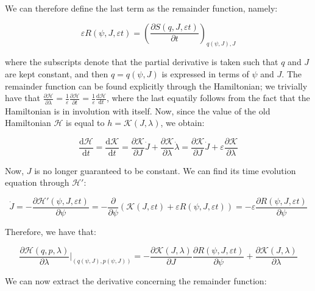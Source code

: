 We can therefore define the last term as the remainder function, namely:

\begin{equation}
    \varepsilon R(\psi, J, \varepsilon t)=\left(\frac{\partial S(q,J,\varepsilon t)}{\partial t}\right)_{q(\psi,J),J}
\end{equation}

where the subscripts denote that the partial derivative is taken such that $q$ and $J$ are kept constant, and then $q=q(\psi, J)$ is expressed in terms of $\psi$ and $J$. The remainder function can be found explicitly through the Hamiltonian; we trivially have that $\frac{\partial \mathcal{H}}{\partial \lambda}=\frac{1}{\varepsilon}\frac{\partial \mathcal{H}}{\partial t}=\frac{1}{\varepsilon}\frac{\mathrm{d}\mathcal{H}}{\mathrm{d}t}$, where the last equatily follows from the fact that the Hamiltonian is in involution with itself. Now, since the value of the old Hamiltonian $\mathcal{H}$ is equal to $h=\mathcal{K}(J,\lambda)$, we obtain:

\begin{equation*}
    \frac{\mathrm{d}\mathcal{H}}{\mathrm{d}t}=\frac{\mathrm{d}\mathcal{K}}{\mathrm{d}t}=\frac{\partial \mathcal{K}}{\partial J}\dot{J}+\frac{\partial\mathcal{K}}{\partial \lambda}\dot{\lambda}=\frac{\partial \mathcal{K}}{\partial J}\dot{J}+\varepsilon \frac{\partial \mathcal{K}}{\partial \lambda}
\end{equation*}

Now, $J$ is no longer guaranteed to be constant. We can find its time evolution equation through $\mathcal{H}'$:

\begin{equation*}
    \dot{J}=-\frac{\partial \mathcal{H}'(\psi, J,\varepsilon t)}{\partial \psi}=-\frac{\partial}{\partial \psi}\left(\mathcal{K}(J,\varepsilon t)+\varepsilon R(\psi, J,\varepsilon t)\right)=-\varepsilon \frac{\partial R(\psi, J,\varepsilon t)}{\partial \psi}
\end{equation*}

Therefore, we have that:

\begin{equation*}
    \frac{\partial \mathcal{H}(q,p,\lambda)}{\partial \lambda}\Bigr|_{\left(q(\psi,J),p(\psi,J)\right)}=-\frac{\partial\mathcal{K}(J,\lambda)}{\partial J}\frac{\partial R(\psi,J,\varepsilon t)}{\partial \psi}+\frac{\partial \mathcal{K}(J,\lambda)}{\partial \lambda}
\end{equation*}

We can now extract the derivative concerning the remainder function:

